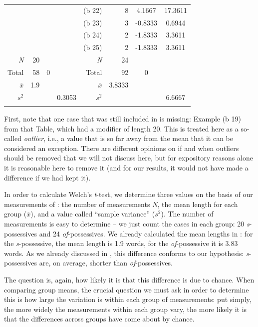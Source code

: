\begin{table}
\begin{tabular}[t]{rrS[table-format=-1.1]crrS[table-format=-1.4]S[table-format=2.4]}
 & & & & (b 22) & 8 & 4.1667 & 17.3611 \\
 & & & & (b 23) & 3 & -0.8333 & 0.6944 \\
 & & & & (b 24) & 2 & -1.8333 & 3.3611 \\
 & & & & (b 25) & 2 & -1.8333 & 3.3611 \\
\midrule
\textit{N} & 20 & &  & \textit{N} & 24 & & \\
Total & 58 & 0 &  & Total & 92 & 0 & \\
$\overline{x}$ & 1.9 & & & $\overline{x}$ & 3.8333 & & \\
$s^2$ & & & 0.3053  & $s^2$ & & & 6.6667 \\
\lspbottomrule
\end{tabular}
\end{table}

First, note that one case that was still included in  is missing: Example (b 19) from that Table, which had a modifier of length  20. This is treated here as a so\hyp{}called \emph{outlier}, i.e., a value that is so far away from the mean that it can be considered an exception. There are different opinions on if and when outliers should be removed that we will not discuss here, but for expository reasons alone it is reasonable here to remove it (and for our results, it would not have made a difference if we had kept it).

In order to calculate Welch's \textit{t}-test,  we determine three values on the basis of our measurements  of :  the number of measurements \textit{N}, the mean  length for each group ($\overline{x}$), and a value called ``sample variance''  ($s^2$). The number of measurements is easy to determine -- we just count the cases in each group: 20 \textit{s}-possessives  and 24 \textit{of}-possessives. We already calculated the mean  lengths in : for the \textit{s}-possessive, the mean length  is 1.9 words, for the \textit{of}-possessive it is 3.83 words. As we already discussed in , this difference conforms to our hypothesis: \textit{s}-possessives are, on average, shorter than  \textit{of}-possessives.

The question is, again, how likely it is that this difference is due to chance.  When comparing group means, the crucial question we must ask in order to determine this is how large the variation  is within each group of measurements:  put simply, the more widely the measurements within each group vary, the more likely it is that the differences across groups have come about by  chance.

